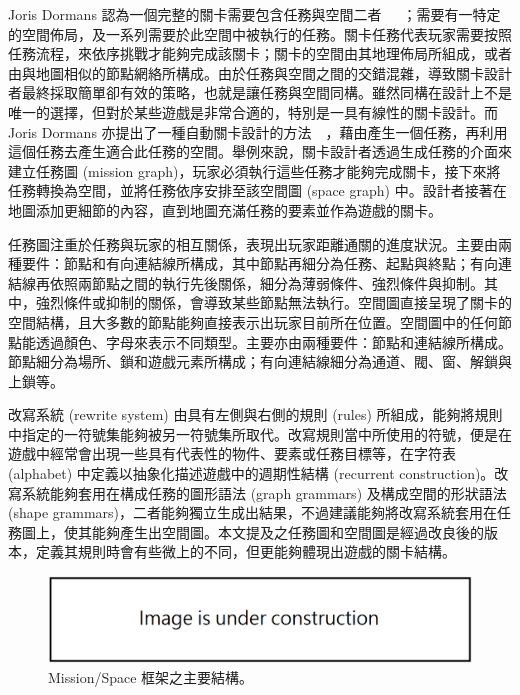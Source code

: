 Joris Dormans 認為一個完整的關卡需要包含任務與空間二者~\cite{dormans2010adventures}~\cite{dormans2011level}~\cite{dormans2012engineering}；需要有一特定的空間佈局，及一系列需要於此空間中被執行的任務。關卡任務代表玩家需要按照任務流程，來依序挑戰才能夠完成該關卡；關卡的空間由其地理佈局所組成，或者由與地圖相似的節點網絡所構成。由於任務與空間之間的交錯混雜，導致關卡設計者最終採取簡單卻有效的策略，也就是讓任務與空間同構。雖然同構在設計上不是唯一的選擇，但對於某些遊戲是非常合適的，特別是一具有線性的關卡設計。而 Joris Dormans 亦提出了一種自動關卡設計的方法~\cite{dormans2010adventures}~\cite{dormans2012engineering}，藉由產生一個任務，再利用這個任務去產生適合此任務的空間。舉例來說，關卡設計者透過生成任務的介面來建立任務圖 (mission graph)，玩家必須執行這些任務才能夠完成關卡，接下來將任務轉換為空間，並將任務依序安排至該空間圖 (space graph) 中。設計者接著在地圖添加更細節的內容，直到地圖充滿任務的要素並作為遊戲的關卡。

任務圖注重於任務與玩家的相互關係，表現出玩家距離通關的進度狀況。主要由兩種要件：節點和有向連結線所構成，其中節點再細分為任務、起點與終點；有向連結線再依照兩節點之間的執行先後關係，細分為薄弱條件、強烈條件與抑制。其中，強烈條件或抑制的關係，會導致某些節點無法執行。空間圖直接呈現了關卡的空間結構，且大多數的節點能夠直接表示出玩家目前所在位置。空間圖中的任何節點能透過顏色、字母來表示不同類型。主要亦由兩種要件：節點和連結線所構成。節點細分為場所、鎖和遊戲元素所構成；有向連結線細分為通道、閥、窗、解鎖與上鎖等。

改寫系統 (rewrite system) 由具有左側與右側的規則 (rules) 所組成，能夠將規則中指定的一符號集能夠被另一符號集所取代。改寫規則當中所使用的符號，便是在遊戲中經常會出現一些具有代表性的物件、要素或任務目標等，在字符表 (alphabet) 中定義以抽象化描述遊戲中的週期性結構 (recurrent construction)。改寫系統能夠套用在構成任務的圖形語法 (graph grammars) 及構成空間的形狀語法 (shape grammars)，二者能夠獨立生成出結果，不過建議能夠將改寫系統套用在任務圖上，使其能夠產生出空間圖。本文提及之任務圖和空間圖是經過改良後的版本，定義其規則時會有些微上的不同，但更能夠體現出遊戲的關卡結構。

\begin{figure}[h]
  \begin{center}
    \includegraphics[width=1.0\textwidth]{figures/under_construction.png}
    \caption{Mission/Space 框架之主要結構。} 
    \label{fig:structure-of-mission-space-framework}
  \end{center}
\end{figure}

